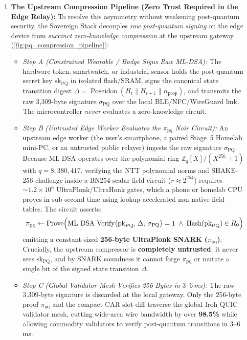 \documentclass[a4paper,11pt,twoside,parskip=half-,headings=small]{scrartcl}
\begin{document}
\begin{enumerate}[nosep]
  \item \textbf{The Upstream Compression Pipeline (Zero Trust Required in the Edge Relay):}
  To resolve this asymmetry without weakening post-quantum security, the Sovereign Stack decouples \emph{raw post-quantum signing} on the edge device from \emph{succinct zero-knowledge compression} at the upstream gateway (\cref{fig:pq_compression_pipeline}):
  \begin{itemize}[nosep]
    \item \emph{Step A (Constrained Wearable / Badge Signs Raw ML-DSA):} The hardware token, smartwatch, or industrial sensor holds the post-quantum secret key $\text{sk}_{\text{PQ}}$ in isolated flash/SRAM, signs the canonical state transition digest $\Delta = \operatorname{Poseidon}(H_t \parallel H_{t+1} \parallel n_{\text{prop}})$, and transmits the raw 3,309-byte signature $\sigma_{\text{PQ}}$ over the local BLE/NFC/WireGuard link. The microcontroller \emph{never} evaluates a zero-knowledge circuit.
    \item \emph{Step B (Untrusted Edge Worker Evaluates the $\pi_{\text{pq}}$ Noir Circuit):} An upstream edge worker (the user's smartphone, a paired Stage~5 Homelab mini-PC, or an untrusted public relayer) ingests the raw signature $\sigma_{\text{PQ}}$. Because ML-DSA operates over the polynomial ring $\mathbb{Z}_q[X]/(X^{256}+1)$ with $q = 8{,}380{,}417$, verifying the NTT polynomial norms and SHAKE-256 challenge inside a BN254 scalar field circuit ($r \approx 2^{254}$) requires $\sim 1.2 \times 10^6$ UltraPlonk/UltraHonk gates, which a phone or homelab CPU proves in sub-second time using lookup-accelerated non-native field tables. The circuit asserts:
    \begin{equation}
      \pi_{\text{pq}} \leftarrow \operatorname{Prove}\Bigl(\operatorname{ML-DSA-Verify}\bigl(\text{pk}_{\text{PQ}},\, \Delta,\, \sigma_{\text{PQ}}\bigr) = 1 \;\land\; \operatorname{Hash}(\text{pk}_{\text{PQ}}) \in R_0\Bigr)
    \end{equation}
    emitting a constant-sized \textbf{256-byte UltraPlonk SNARK ($\pi_{\text{pq}}$)}. Crucially, the upstream compressor is \textbf{completely untrusted}: it never sees $\text{sk}_{\text{PQ}}$, and by SNARK soundness it cannot forge $\pi_{\text{pq}}$ or mutate a single bit of the signed state transition $\Delta$.
    \item \emph{Step C (Global Validator Mesh Verifies 256 Bytes in $3$--$6$\,ms):} The raw 3,309-byte signature is discarded at the local gateway. Only the 256-byte proof $\pi_{\text{pq}}$ and the compact CAR slot diff traverse the global Iroh QUIC validator mesh, cutting wide-area wire bandwidth by over \textbf{98.5\%} while allowing commodity validators to verify post-quantum transitions in $3$--$6$\,ms.
  \end{itemize}


\end{enumerate}
\end{document}
